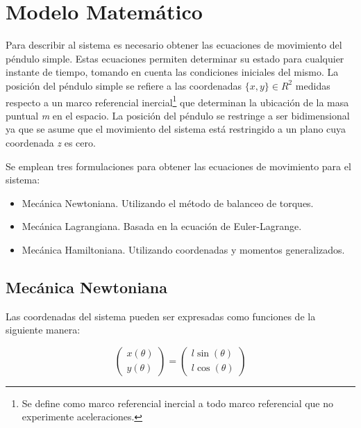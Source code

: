 \section{Modelo Matemático}

Para describir al sistema es necesario obtener las ecuaciones 
de movimiento del péndulo simple. 
Estas ecuaciones permiten 
determinar su estado para cualquier 
instante de tiempo, tomando en cuenta las condiciones 
iniciales del mismo. 
La posición del péndulo simple se refiere a 
las coordenadas  $\{x, y\} \in R^2$  medidas respecto a un marco 
referencial inercial\footnote{Se define como marco 
referencial inercial a todo marco referencial que no 
experimente aceleraciones.} 
que determinan la ubicación de 
la masa puntual \emph{m} en el espacio.
La posición del péndulo se restringe a ser bidimensional
ya que se asume que el movimiento del sistema está restringido a un plano
cuya coordenada \emph{z} es cero.

Se emplean tres formulaciones para obtener las ecuaciones 
de movimiento para el sistema:
\begin{itemize}
 \item Mecánica Newtoniana. Utilizando el método de balanceo de torques.
 \item Mecánica Lagrangiana. Basada en la ecuación de Euler-Lagrange.
 \item Mecánica Hamiltoniana. Utilizando coordenadas y momentos generalizados.
\end{itemize}




\subsection{Mecánica Newtoniana}

Las coordenadas del sistema pueden ser expresadas como funciones
de la siguiente manera:

\begin{equation}
 \begin{pmatrix}
 x(\theta)\\
 y(\theta)
 \end{pmatrix}
 = \begin{pmatrix}
 l \sin (\theta)\\
 l \cos (\theta)
 \end{pmatrix}
 \label{eq: system coordinates}
\end{equation}

